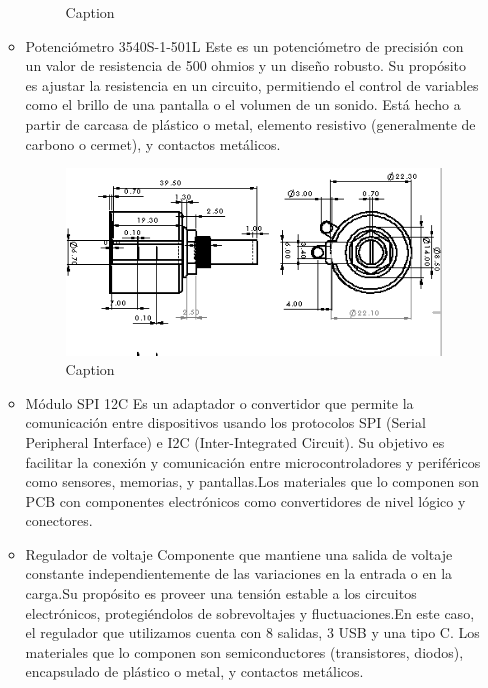 \begin{itemize}
\begin{itemize}
\begin{figure}[H]
        \caption{Caption}
        \label{fig:enter-label}
    \end{figure}
    
    \item Potenciómetro 3540S-1-501L
     Este es un potenciómetro de precisión con un valor de resistencia de 500 ohmios y un diseño robusto. Su propósito es ajustar la resistencia en un circuito, permitiendo el control de variables como el brillo de una pantalla o el volumen de un sonido. Está hecho a partir de carcasa de plástico o metal, elemento resistivo (generalmente de carbono o cermet), y contactos metálicos.
     \begin{figure}[H]
         \centering
         \includegraphics[scale=0.7]{32/img/potenciometroCotas.PNG}
         \caption{Caption}
         \label{fig:enter-label}
     \end{figure}
    \item Módulo SPI 12C
     Es un adaptador o convertidor que permite la comunicación entre dispositivos usando los protocolos SPI (Serial Peripheral Interface) e I2C (Inter-Integrated Circuit). Su objetivo es facilitar la conexión y comunicación entre microcontroladores y periféricos como sensores, memorias, y pantallas.Los materiales que lo componen son PCB con componentes electrónicos como convertidores de nivel lógico y conectores.
    

    \item Regulador de voltaje
     Componente que mantiene una salida de voltaje constante independientemente de las variaciones en la entrada o en la carga.Su propósito es proveer una tensión estable a los circuitos electrónicos, protegiéndolos de sobrevoltajes y fluctuaciones.En este caso, el regulador que utilizamos cuenta con 8 salidas, 3 USB y una tipo C. Los materiales que lo componen son semiconductores (transistores, diodos), encapsulado de plástico o metal, y contactos metálicos.
     

\end{itemize}
\end{itemize}
